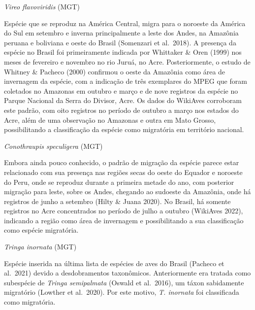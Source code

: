 \documentclass[
  oneside]{scrbook}
\begin{document}
\begin{blackbox}
\emph{Vireo flavoviridis} (MGT)

Espécie que se reproduz na América Central, migra para o noroeste da América do Sul em setembro e inverna principalmente a leste dos Andes, na Amazônia peruana e boliviana e oeste do Brasil (Somenzari et al.~2018). A presença da espécie no Brasil foi primeiramente indicada por Whittaker \& Oren (1999) nos meses de fevereiro e novembro no rio Juruá, no Acre. Posteriormente, o estudo de Whitney \& Pacheco (2000) confirmou o oeste da Amazônia como área de invernagem da espécie, com a indicação de três exemplares do MPEG que foram coletados no Amazonas em outubro e março e de nove registros da espécie no Parque Nacional da Serra do Divisor, Acre. Os dados do WikiAves corroboram este padrão, com oito registros no período de outubro a março nos estados do Acre, além de uma observação no Amazonas e outra em Mato Grosso, possibilitando a classificação da espécie como migratória em território nacional.

\end{blackbox}

\begin{blackbox}
\emph{Conothraupis speculigera} (MGT)

Embora ainda pouco conhecido, o padrão de migração da espécie parece estar relacionado com sua presença nas regiões secas do oeste do Equador e noroeste do Peru, onde se reproduz durante a primeira metade do ano, com posterior migração para leste, sobre os Andes, chegando ao sudoeste da Amazônia, onde há registros de junho a setembro (Hilty \& Juana 2020). No Brasil, há somente registros no Acre concentrados no período de julho a outubro (WikiAves 2022), indicando a região como área de invernagem e possibilitando a sua classificação como espécie migratória.

\end{blackbox}

\begin{blackbox}
\emph{Tringa inornata} (MGT)

Espécie inserida na última lista de espécies de aves do Brasil (Pacheco et al.~2021) devido a desdobramentos taxonômicos. Anteriormente era tratada como subespécie de \emph{Tringa semipalmata} (Oswald et al.~2016), um táxon sabidamente migratório (Lowther et al.~2020). Por este motivo, \emph{T. inornata} foi classificada como migratória.

\end{blackbox}
\end{document}
